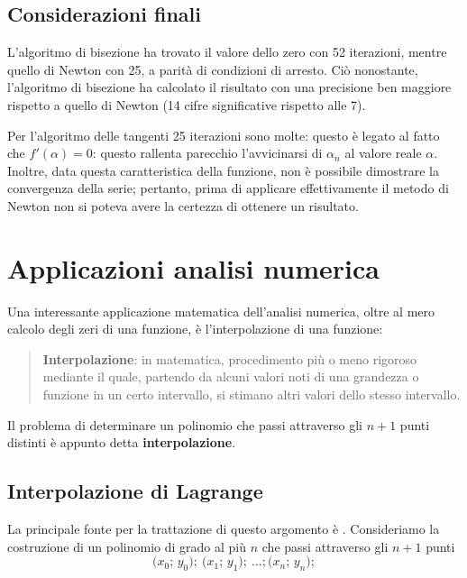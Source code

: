 \section{Considerazioni finali}

L'algoritmo di bisezione ha trovato il valore dello zero con 52 iterazioni, mentre quello di Newton con 25, a parità di condizioni di arresto. Ciò nonostante, l'algoritmo di bisezione ha calcolato il risultato con una precisione ben maggiore rispetto a quello di Newton (14 cifre significative rispetto alle 7).

Per l'algoritmo delle tangenti 25 iterazioni sono molte: questo è legato al fatto che $f'(\alpha)=0$: questo rallenta parecchio l'avvicinarsi di $\alpha_n$ al valore reale $\alpha$. Inoltre, data questa caratteristica della funzione, non è possibile dimostrare la convergenza della serie; pertanto, prima di applicare effettivamente il metodo di Newton non si poteva avere la certezza di ottenere un risultato.

\chapter{Applicazioni analisi numerica}

Una interessante applicazione matematica dell'analisi numerica, oltre al mero calcolo degli zeri di una funzione, è l'interpolazione di una funzione:
\begin{quotation}
\noindent \textbf{Interpolazione}: in matematica, procedimento più o meno rigoroso mediante il quale, partendo da alcuni valori noti di una grandezza o funzione in un certo intervallo, si stimano altri valori dello stesso intervallo.
\end{quotation}

Il problema di determinare un polinomio che passi attraverso gli $n+1$ punti distinti è appunto detta \textbf{interpolazione}.

\section{Interpolazione di Lagrange}

La principale fonte per la trattazione di questo argomento è \parencite[106-114]{num:an}. Consideriamo la costruzione di un polinomio di grado al più $n$ che passi attraverso gli $n+1$ punti
\[
\big(x_0;\,y_0\big);\:\big(x_1;\,y_1\big);\:\dots;\big(x_n;\,y_n\big);
\]

